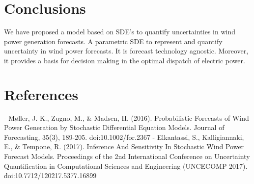 \documentclass[10pt,twocolumn,letterpaper]{article}
\begin{document}
\section{Conclusions}
We have proposed a model based on SDE's to quantify uncertainties in wind power generation forecasts. A parametric SDE to represent and quantify  uncertainty in wind power forecasts. It is forecast technology agnostic. Moreover, it provides a basis for decision making in the optimal dispatch of electric power.



\section*{References}
\begin{flushleft}
- M\o ller, J. K., Zugno, M., \& Madsen, H. (2016). Probabilistic Forecasts of Wind Power Generation by Stochastic Differential Equation Models. Journal of Forecasting, 35(3), 189-205. doi:10.1002/for.2367 \linebreak
- Elkantassi, S., Kalligiannaki, E., \& Tempone, R. (2017). Inference And Sensitivity In Stochastic Wind Power Forecast Models. Proceedings of the 2nd International Conference on Uncertainty Quantification in Computational Sciences and Engineering (UNCECOMP 2017). doi:10.7712/120217.5377.16899
\end{flushleft}





{\small


}
\end{document}
